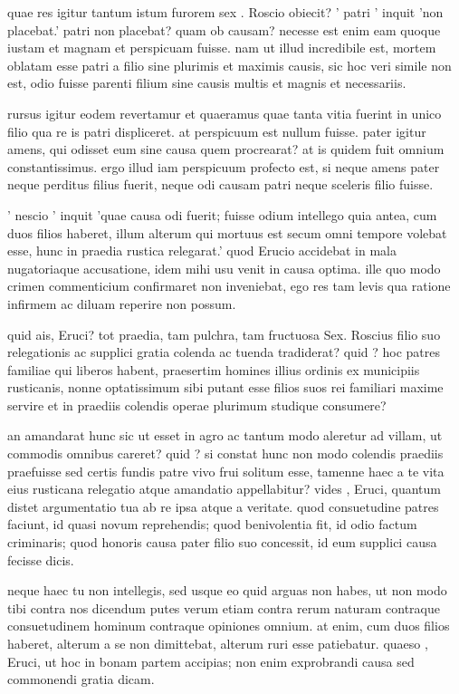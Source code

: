  quae res igitur tantum istum furorem sex . Roscio obiecit? ' patri ' inquit 'non placebat.' patri non placebat? quam ob causam? necesse est enim eam quoque iustam et magnam et perspicuam fuisse. nam ut illud incredibile est, mortem oblatam esse patri a filio sine plurimis et maximis causis, sic hoc veri simile non est, odio fuisse parenti filium sine causis multis et magnis et necessariis.

 rursus igitur eodem revertamur et quaeramus quae tanta vitia fuerint in unico filio qua re is patri displiceret. at perspicuum est nullum fuisse. pater igitur amens, qui odisset eum sine causa quem procrearat? at is quidem fuit omnium constantissimus. ergo illud iam perspicuum profecto est, si neque amens pater neque perditus filius fuerit, neque odi causam patri neque sceleris filio fuisse.

 ' nescio ' inquit 'quae causa odi fuerit; fuisse odium intellego quia antea, cum duos filios haberet, illum alterum qui mortuus est secum omni tempore volebat esse, hunc in praedia rustica relegarat.' quod Erucio accidebat in mala nugatoriaque accusatione, idem mihi usu venit in causa optima. ille quo modo crimen commenticium confirmaret non inveniebat, ego res tam levis qua ratione infirmem ac diluam reperire non possum.

 quid ais, Eruci? tot praedia, tam pulchra, tam fructuosa Sex. Roscius filio suo relegationis ac supplici gratia colenda ac tuenda tradiderat? quid ? hoc patres familiae qui liberos habent, praesertim homines illius ordinis ex municipiis rusticanis, nonne optatissimum sibi putant esse filios suos rei familiari maxime servire et in praediis colendis operae plurimum studique consumere?

 an amandarat hunc sic ut esset in agro ac tantum modo aleretur ad villam, ut commodis omnibus careret? quid ? si constat hunc non modo colendis praediis praefuisse sed certis fundis patre vivo frui solitum esse, tamenne haec a te vita eius rusticana relegatio atque amandatio appellabitur? vides , Eruci, quantum distet argumentatio tua ab re ipsa atque a veritate. quod consuetudine patres faciunt, id quasi novum reprehendis; quod benivolentia fit, id odio factum criminaris; quod honoris causa pater filio suo concessit, id eum supplici causa fecisse dicis.

 neque haec tu non intellegis, sed usque eo quid arguas non habes, ut non modo tibi contra nos dicendum putes verum etiam contra rerum naturam contraque consuetudinem hominum contraque opiniones omnium. at enim, cum duos filios haberet, alterum a se non dimittebat, alterum ruri esse patiebatur. quaeso , Eruci, ut hoc in bonam partem accipias; non enim exprobrandi causa sed commonendi gratia dicam.

